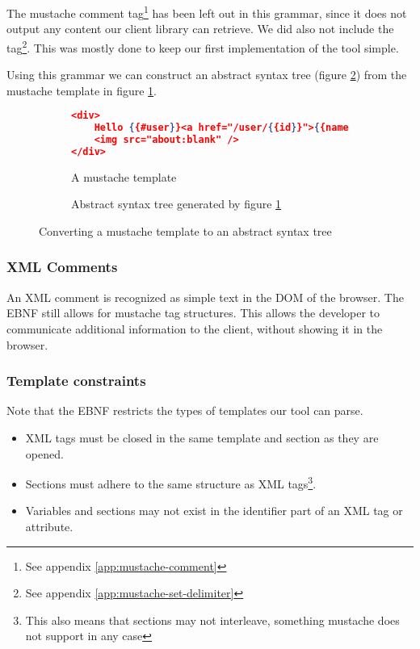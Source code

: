 \documentclass[thesis.tex]{subfiles}
\begin{document}
The mustache comment tag\footnote{See appendix \ref{app:mustache-comment}}
has been left out in this grammar, since it does not output any content our
client library can retrieve.
We did also not include the 
tag\footnote{See appendix \ref{app:mustache-set-delimiter}}.
This was mostly done to keep our first implementation of the tool simple.

Using this grammar we can construct an abstract syntax tree
(figure \ref{fig:ast.ast}) from the mustache template in figure
\ref{fig:ast.mustache}.

\begin{figure}
	\centering
	\begin{subfigure}{\linewidth}
		\caption{A mustache template}
		\label{fig:ast.mustache}
		\begin{lstlisting}[language=JSON]
<div>
	Hello {{#user}}<a href="/user/{{id}}">{{name}}</a>{{/user}}
	<img src="about:blank" />
</div>
		\end{lstlisting}
	\end{subfigure}
	
	\begin{subfigure}{\linewidth}
		\caption{Abstract syntax tree generated by figure \ref{fig:ast.mustache}}
		\label{fig:ast.ast}
		\resizebox{\linewidth}{!}{}
	\end{subfigure}
	\caption{Converting a mustache template to an abstract syntax tree}
	\label{fig:ast}
\end{figure}

\subsubsection{XML Comments}
An XML comment is recognized as simple text in the DOM of the browser. The EBNF
still allows for mustache tag structures. This allows the developer to
communicate additional information to the client, without showing it in the
browser.

\subsubsection{Template constraints}
\label{sec:template-constraints}
Note that the EBNF restricts the types of templates our tool can parse.

\begin{itemize}
\item XML tags must be closed in the same template and section as they are opened.
\item Sections must adhere to the same structure as XML tags\footnote{This also
	means that sections may not interleave, something mustache does not support in
	any case}.
\item Variables and sections may not exist in the identifier part of an XML tag
  or attribute.
\end{itemize}
\end{document}
